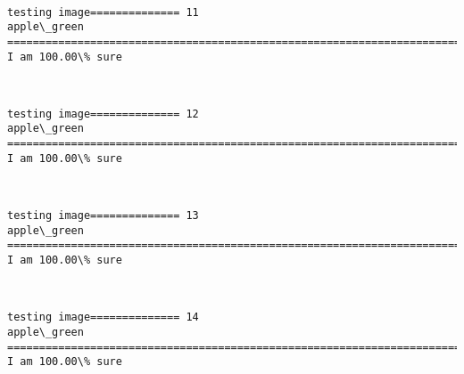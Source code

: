 \documentclass[11pt]{article}
\begin{document}
    \begin{center}
    \end{center}
    { \hspace*{\fill} \\}
    
    \begin{Verbatim}[commandchars=\\\{\}]
testing image============== 11
apple\_green
============================================================================
I am 100.00\% sure

    \end{Verbatim}

    \begin{center}
    \end{center}
    { \hspace*{\fill} \\}
    
    \begin{Verbatim}[commandchars=\\\{\}]
testing image============== 12
apple\_green
============================================================================
I am 100.00\% sure

    \end{Verbatim}

    \begin{center}
    \end{center}
    { \hspace*{\fill} \\}
    
    \begin{Verbatim}[commandchars=\\\{\}]
testing image============== 13
apple\_green
============================================================================
I am 100.00\% sure

    \end{Verbatim}

    \begin{center}
    \end{center}
    { \hspace*{\fill} \\}
    
    \begin{Verbatim}[commandchars=\\\{\}]
testing image============== 14
apple\_green
============================================================================
I am 100.00\% sure

    \end{Verbatim}
\end{document}

